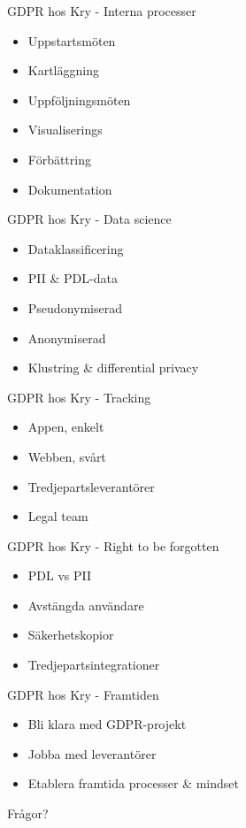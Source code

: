 \documentclass[10pt, compress]{beamer}
\begin{document}
\begin{frame}{GDPR hos Kry - Interna processer}

 \begin{itemize}
  \item Uppstartsmöten
  \item Kartläggning
  \item Uppföljningsmöten
  \item Visualiserings
  \item Förbättring
  \item Dokumentation
  \end{itemize}    

\end{frame}

\begin{frame}{GDPR hos Kry - Data science}

 \begin{itemize}
  \item Dataklassificering
  \item PII \& PDL-data
  \item Pseudonymiserad
  \item Anonymiserad
  \item Klustring \& differential privacy
  \end{itemize}    

\end{frame}

\begin{frame}{GDPR hos Kry - Tracking}

 \begin{itemize}
  \item Appen, enkelt
  \item Webben, svårt
  \item Tredjepartsleverantörer
  \item Legal team
  \end{itemize}    

\end{frame}

\begin{frame}{GDPR hos Kry - Right to be forgotten}

 \begin{itemize}
  \item PDL vs PII
  \item Avstängda användare
  \item Säkerhetskopior
  \item Tredjepartsintegrationer
  \end{itemize}    

\end{frame}

\begin{frame}{GDPR hos Kry - Framtiden}

 \begin{itemize}
  \item Bli klara med GDPR-projekt
  \item Jobba med leverantörer
  \item Etablera framtida processer \& mindset
  \end{itemize}    

\end{frame}


\begin{frame}[standout]
Frågor?
\end{frame}
\end{document}
